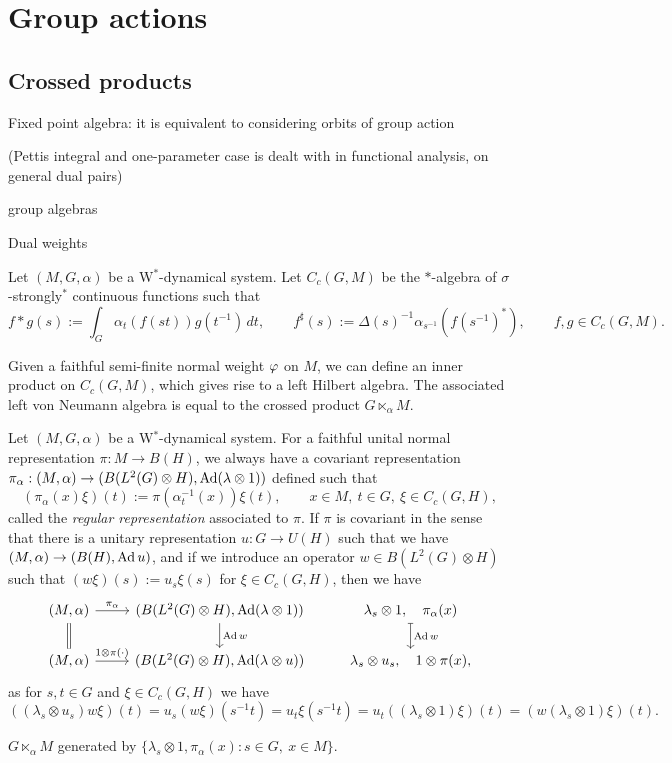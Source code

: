 \documentclass{../../large}
\begin{document}
\chapter{Group actions}



\section{Crossed products}

Fixed point algebra: it is equivalent to considering orbits of group action

(Pettis integral and one-parameter case is dealt with in functional analysis, on general dual pairs)

group algebras

Dual weights
\begin{prb}
Let $(M,G,\alpha)$ be a W$^*$-dynamical system.
Let $C_c(G,M)$ be the $*$-algebra of $\sigma$-strongly$^*$ continuous functions such that
\[f*g(s):=\int_G\alpha_t(f(st))g(t^{-1})\,dt,\qquad f^\sharp(s):=\Delta(s)^{-1}\alpha_{s^{-1}}(f(s^{-1})^*),\qquad f,g\in C_c(G,M).\]



Given a faithful semi-finite normal weight $\varphi$ on $M$, we can define an inner product on $C_c(G,M)$, which gives rise to a left Hilbert algebra.
The associated left von Neumann algebra is equal to the crossed product $G\ltimes_\alpha M$.
\end{prb}





\begin{prb}
Let $(M,G,\alpha)$ be a W$^*$-dynamical system.
For a faithful unital normal representation $\pi:M\to B(H)$, we always have a covariant representation $\pi_\alpha:(M,\alpha)\to(B(L^2(G)\otimes H),\operatorname{Ad}(\lambda\otimes1))$ defined such that
\[(\pi_\alpha(x)\xi)(t):=\pi(\alpha_t^{-1}(x))\xi(t),\qquad x\in M,\ t\in G,\ \xi\in C_c(G,H),\]
called the \emph{regular representation} associated to $\pi$.
If $\pi$ is covariant in the sense that there is a unitary representation $u:G\to U(H)$ such that we have $(M,\alpha)\to(B(H),\operatorname{Ad} u)$, and if we introduce an operator $w\in B(L^2(G)\otimes H)$ such that $(w\xi)(s):=u_s\xi(s)$ for $\xi\in C_c(G,H)$, then we have
\[\begin{tikzcd}
(M,\alpha) \rar{\pi_\alpha} \dar[equal]&
(B(L^2(G)\otimes H),\Ad(\lambda\otimes1)) \dar{\Ad w} &
\lambda_s\otimes1,\quad\pi_\alpha(x) \dar[mapsto]{\Ad w}\\
(M,\alpha) \rar{1\otimes\pi(\cdot)} &
(B(L^2(G)\otimes H),\Ad(\lambda\otimes u)) &
\lambda_s\otimes u_s,\quad1\otimes\pi(x),
\end{tikzcd}\]
as for $s,t\in G$ and $\xi\in C_c(G,H)$ we have
\[((\lambda_s\otimes u_s)w\xi)(t)=u_s(w\xi)(s^{-1}t)=u_t\xi(s^{-1}t)=u_t((\lambda_s\otimes1)\xi)(t)=(w(\lambda_s\otimes1)\xi)(t).\]
\begin{parts}
\item $G\ltimes_\alpha M$ generated by $\{\lambda_s\otimes1,\pi_\alpha(x):s\in G,\ x\in M\}$.
\end{parts}
\end{prb}
\end{document}

